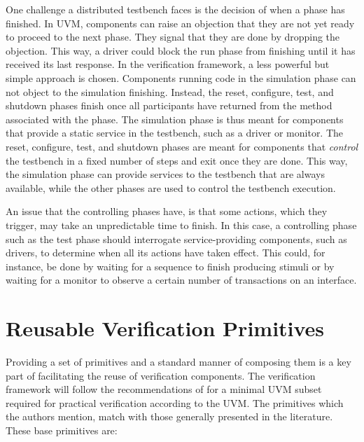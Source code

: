 One challenge a distributed testbench faces is the decision of when a phase has finished. In UVM, components can raise
an objection that they are not yet ready to proceed to the next phase. They signal that they are done by
dropping the objection. This way, a driver could block the run phase from finishing until it has
received its last response. In the verification framework, a less powerful but simple approach is chosen. Components
running code in the simulation phase can not object to the simulation finishing. Instead, the reset, configure,
test, and shutdown phases finish once all participants have returned from the method associated with the phase. The
simulation phase is thus meant for components that provide a static service in the testbench, such as a driver or
monitor. The reset, configure, test, and shutdown phases are meant for components that \textit{control} the testbench
in a fixed number of steps and exit once they are done. This way, the simulation phase can provide services
to the testbench that are always available, while the other phases are used to control the testbench execution.

An issue that the controlling phases have, is that some actions, which they trigger, may take an unpredictable time to
finish. In this case, a controlling phase such as the test phase should interrogate service-providing components, such
as drivers, to determine when all its actions have taken effect. This could, for instance, be done by waiting for a
sequence to finish producing stimuli or by waiting for a monitor to observe a certain number of transactions on an interface.


\section{Reusable Verification Primitives} %

Providing a set of primitives and a standard manner of composing them is a key part of facilitating the reuse of
verification components. The verification framework will follow the recommendations of \citeauthor{sutherland2015uvm}
\cite{sutherland2015uvm} for a minimal UVM subset required for practical verification according to the UVM. The
primitives which the authors mention, match with those generally presented in the literature. These base primitives are:

